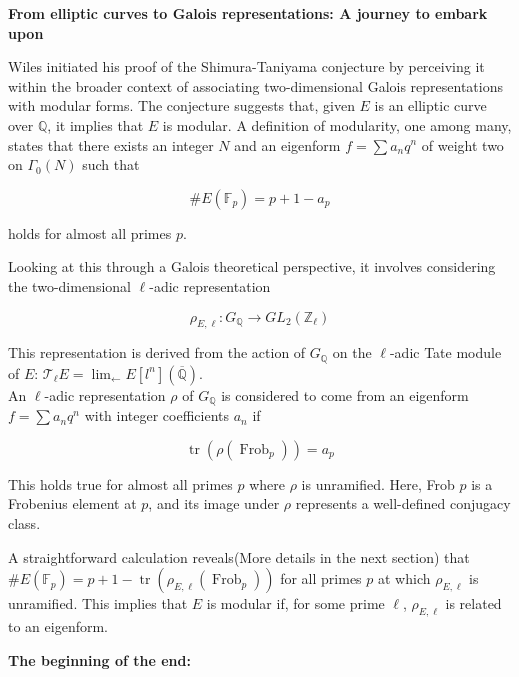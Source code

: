 \begin{center}
    \textbf{From elliptic curves to Galois representations: A journey to embark upon}
\end{center}

Wiles initiated his proof of the Shimura-Taniyama conjecture by perceiving it within the broader context of associating two-dimensional Galois representations with modular forms. The conjecture suggests that, given \( E \) is an elliptic curve over \( \mathbb{Q} \), it implies that \( E \) is modular. A definition of modularity, one among many, states that there exists an integer \( N \) and an eigenform \( f = \sum a_{n} q^{n} \) of weight two on \( \Gamma_{0}(N) \) such that 

\[
\# E\left(\mathbb{F}_{p}\right)=p+1-a_{p}
\]

holds for almost all primes \( p \).

Looking at this through a Galois theoretical perspective, it involves considering the two-dimensional \( \ell \)-adic representation 

\[
\rho_{E, \ell}: G_{\mathbb{Q}} \longrightarrow GL_{2}\left(\mathbb{Z}_{\ell}\right)
\]

This representation is derived from the action of \( G_{\mathbb{Q}} \) on the \( \ell \)-adic Tate module of \( E \): \( \mathcal{T}_{\ell} E= \lim _{\leftarrow} E\left[l^{n}\right](\overline{\mathbb{Q}}) \).\\ An \( \ell \)-adic representation \( \rho \) of \( G_{\mathbb{Q}} \) is considered to come from an eigenform \( f = \sum a_{n} q^{n} \) with integer coefficients \( a_{n} \) if 

\[
\operatorname{tr}\left(\rho\left(\operatorname{Frob}_{p}\right)\right)=a_{p}
\]

This holds true for almost all primes \( p \) where \( \rho \) is unramified. Here, Frob \( p \) is a Frobenius element at \( p \), and its image under \( \rho \) represents a well-defined conjugacy class.

A straightforward calculation reveals(More details in the next section) that \( \# E\left(\mathbb{F}_{p}\right)=p+1-\operatorname{tr}\left(\rho_{E, \ell}\left(\operatorname{Frob}_{p}\right)\right) \) for all primes \( p \) at which \( \rho_{E, \ell} \) is unramified. This implies that \( E \) is modular if, for some prime \( \ell \), \( \rho_{E, \ell} \) is related to an eigenform. \\
    

\begin{center}
\textbf{The beginning of the end:}    
\end{center}

